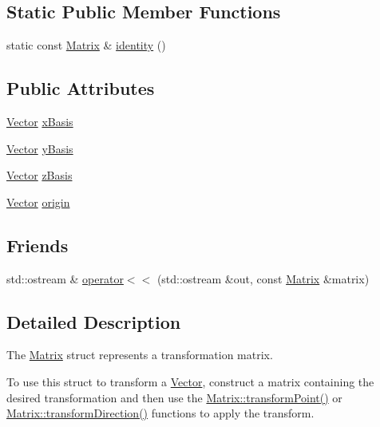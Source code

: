 \subsection*{Static Public Member Functions}
\begin{DoxyCompactItemize}
\item 
static const \hyperlink{struct_leap_1_1_matrix}{Matrix} \& \hyperlink{struct_leap_1_1_matrix_abd8dff1c625a2c21ea01536335334183}{identity} ()
\end{DoxyCompactItemize}
\subsection*{Public Attributes}
\begin{DoxyCompactItemize}
\item 
\hyperlink{struct_leap_1_1_vector}{Vector} \hyperlink{struct_leap_1_1_matrix_a9e5e56926e88315a309007843860eced}{x\+Basis}
\item 
\hyperlink{struct_leap_1_1_vector}{Vector} \hyperlink{struct_leap_1_1_matrix_ad13e4c2baa3681ee9b92faf9da33b19b}{y\+Basis}
\item 
\hyperlink{struct_leap_1_1_vector}{Vector} \hyperlink{struct_leap_1_1_matrix_a62c45d9b2370027de27781fadcfc13d8}{z\+Basis}
\item 
\hyperlink{struct_leap_1_1_vector}{Vector} \hyperlink{struct_leap_1_1_matrix_a64cc576f42312999153c26b6b558fb9d}{origin}
\end{DoxyCompactItemize}
\subsection*{Friends}
\begin{DoxyCompactItemize}
\item 
std\+::ostream \& \hyperlink{struct_leap_1_1_matrix_a5e736a2de52898e1930820f93bfdfba4}{operator$<$$<$} (std\+::ostream \&out, const \hyperlink{struct_leap_1_1_matrix}{Matrix} \&matrix)
\end{DoxyCompactItemize}


\subsection{Detailed Description}
The \hyperlink{struct_leap_1_1_matrix}{Matrix} struct represents a transformation matrix.

To use this struct to transform a \hyperlink{struct_leap_1_1_vector}{Vector}, construct a matrix containing the desired transformation and then use the \hyperlink{struct_leap_1_1_matrix_ac583a10a7bdbf7ed03fd53b8604a41fc}{Matrix\+::transform\+Point()} or \hyperlink{struct_leap_1_1_matrix_a6c7151d9d80487f7a16587e9e4896796}{Matrix\+::transform\+Direction()} functions to apply the transform.

